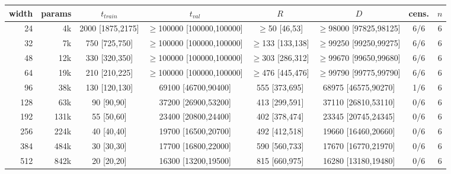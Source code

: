 \begin{tabular}{rrcccccc}
\toprule
width & params & $t_{train}$ & $t_{val}$ & $R$ & $D$ & cens. & $n$ \\
\midrule
24 & 4k & 2000 [1875,2175] & $\geq$100000 [100000,100000] & $\geq$50 [46,53] & $\geq$98000 [97825,98125] & 6/6 & 6 \\
32 & 7k & 750 [725,750] & $\geq$100000 [100000,100000] & $\geq$133 [133,138] & $\geq$99250 [99250,99275] & 6/6 & 6 \\
48 & 12k & 330 [320,350] & $\geq$100000 [100000,100000] & $\geq$303 [286,312] & $\geq$99670 [99650,99680] & 6/6 & 6 \\
64 & 19k & 210 [210,225] & $\geq$100000 [100000,100000] & $\geq$476 [445,476] & $\geq$99790 [99775,99790] & 6/6 & 6 \\
96 & 38k & 130 [120,130] & 69100 [46700,90400] & 555 [373,695] & 68975 [46575,90270] & 1/6 & 6 \\
128 & 63k & 90 [90,90] & 37200 [26900,53200] & 413 [299,591] & 37110 [26810,53110] & 0/6 & 6 \\
192 & 131k & 55 [50,60] & 23400 [20800,24400] & 402 [378,474] & 23345 [20745,24345] & 0/6 & 6 \\
256 & 224k & 40 [40,40] & 19700 [16500,20700] & 492 [412,518] & 19660 [16460,20660] & 0/6 & 6 \\
384 & 484k & 30 [30,30] & 17700 [16800,22000] & 590 [560,733] & 17670 [16770,21970] & 0/6 & 6 \\
512 & 842k & 20 [20,20] & 16300 [13200,19500] & 815 [660,975] & 16280 [13180,19480] & 0/6 & 6 \\
\bottomrule
\end{tabular}